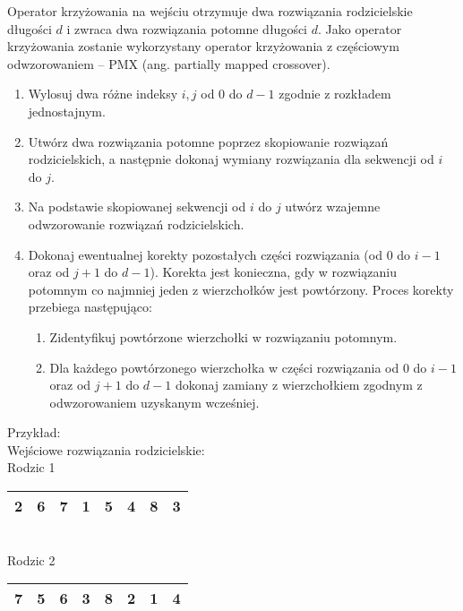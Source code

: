 \documentclass[12pt, a4paper]{article}
\begin{document}
Operator krzyżowania na wejściu otrzymuje dwa rozwiązania rodzicielskie długości $d$ i zwraca dwa rozwiązania potomne długości $d$. 
Jako operator krzyżowania zostanie wykorzystany operator krzyżowania z częściowym odwzorowaniem -- PMX
(ang. partially mapped crossover).
\begin{enumerate}
 \item Wylosuj dwa różne indeksy $i, j$ od 0 do $d-1$ zgodnie z rozkładem jednostajnym.
 \item Utwórz dwa rozwiązania potomne poprzez skopiowanie rozwiązań rodzicielskich, a następnie dokonaj wymiany rozwiązania dla sekwencji od $i$ do $j$.
 \item Na podstawie skopiowanej sekwencji od $i$ do $j$ utwórz wzajemne odwzorowanie rozwiązań rodzicielskich.
 \item Dokonaj ewentualnej korekty pozostałych części rozwiązania (od $0$ do $i-1$ oraz od $j+1$ do $d-1$). 
Korekta jest konieczna, gdy w rozwiązaniu potomnym co najmniej jeden z wierzchołków jest powtórzony.
Proces korekty przebiega następująco:
 \begin{enumerate}
 	\item Zidentyfikuj powtórzone wierzchołki w rozwiązaniu potomnym.
 	\item Dla każdego powtórzonego wierzchołka w części rozwiązania od $0$ do $i-1$ oraz od $j+1$ do $d-1$ 
dokonaj zamiany z wierzchołkiem zgodnym z odwzorowaniem uzyskanym wcześniej.
 \end{enumerate}
\end{enumerate}

Przykład: \\

Wejściowe rozwiązania rodzicielskie: \\

Rodzic 1
\begin{tabular}{ | c | c | c | c | c | c | c | c |}
  \hline
  2 & 6 &  \cellcolor{green!25}7 & \cellcolor{green!25}1 & \cellcolor{green!25}5 & \cellcolor{green!25}4 & 8 & 3 \\ \hline
\end{tabular}\\
Rodzic 2
\begin{tabular}{ | c | c | c | c | c | c | c | c |}
  \hline
  7 & 5 & \cellcolor{blue!25}6 & \cellcolor{blue!25}3 & \cellcolor{blue!25}8 & \cellcolor{blue!25}2 & 1 & 4 \\ \hline
\end{tabular}
\end{document}
